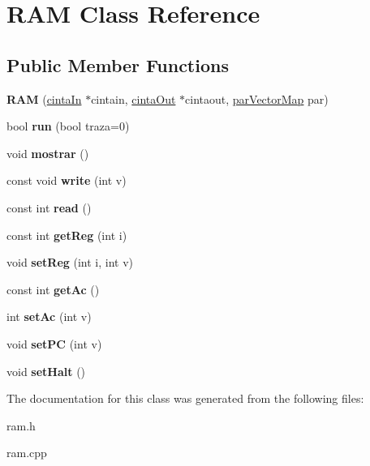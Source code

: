\hypertarget{classRAM}{}\section{R\+A\+M Class Reference}
\label{classRAM}
\subsection*{Public Member Functions}
\begin{DoxyCompactItemize}
\item 
\hypertarget{classRAM_a9990562663dee1c4791abe10021123d6}{}{\bfseries R\+A\+M} (\hyperlink{classcintaIn}{cinta\+In} $\ast$cintain, \hyperlink{classcintaOut}{cinta\+Out} $\ast$cintaout, \hyperlink{structparVectorMap}{par\+Vector\+Map} par)\label{classRAM_a9990562663dee1c4791abe10021123d6}

\item 
\hypertarget{classRAM_aaf2fb352e042c59bab243665a09a9be4}{}bool {\bfseries run} (bool traza=0)\label{classRAM_aaf2fb352e042c59bab243665a09a9be4}

\item 
\hypertarget{classRAM_a040dee5c6ff0d6720ce63971d5bf114e}{}void {\bfseries mostrar} ()\label{classRAM_a040dee5c6ff0d6720ce63971d5bf114e}

\item 
\hypertarget{classRAM_a6157e20d1b91608f42745b885993cc70}{}const void {\bfseries write} (int v)\label{classRAM_a6157e20d1b91608f42745b885993cc70}

\item 
\hypertarget{classRAM_a81149279d91c19d4849508c9351620ae}{}const int {\bfseries read} ()\label{classRAM_a81149279d91c19d4849508c9351620ae}

\item 
\hypertarget{classRAM_a9fa9ebd085a93c05c2c352d6c82232c5}{}const int {\bfseries get\+Reg} (int i)\label{classRAM_a9fa9ebd085a93c05c2c352d6c82232c5}

\item 
\hypertarget{classRAM_a2f88a25cc367459ea068a038d74d499e}{}void {\bfseries set\+Reg} (int i, int v)\label{classRAM_a2f88a25cc367459ea068a038d74d499e}

\item 
\hypertarget{classRAM_a17d680a5fdb98a750a9a51184054fa39}{}const int {\bfseries get\+Ac} ()\label{classRAM_a17d680a5fdb98a750a9a51184054fa39}

\item 
\hypertarget{classRAM_aacf00ab88225ad48f8c5e933b7143529}{}int {\bfseries set\+Ac} (int v)\label{classRAM_aacf00ab88225ad48f8c5e933b7143529}

\item 
\hypertarget{classRAM_a8b24a2f8968c27f9e0ecaa9ce1427ba7}{}void {\bfseries set\+P\+C} (int v)\label{classRAM_a8b24a2f8968c27f9e0ecaa9ce1427ba7}

\item 
\hypertarget{classRAM_ad7be240ddad7ea281c97083795d62a84}{}void {\bfseries set\+Halt} ()\label{classRAM_ad7be240ddad7ea281c97083795d62a84}

\end{DoxyCompactItemize}


The documentation for this class was generated from the following files\+:\begin{DoxyCompactItemize}
\item 
ram.\+h\item 
ram.\+cpp\end{DoxyCompactItemize}
